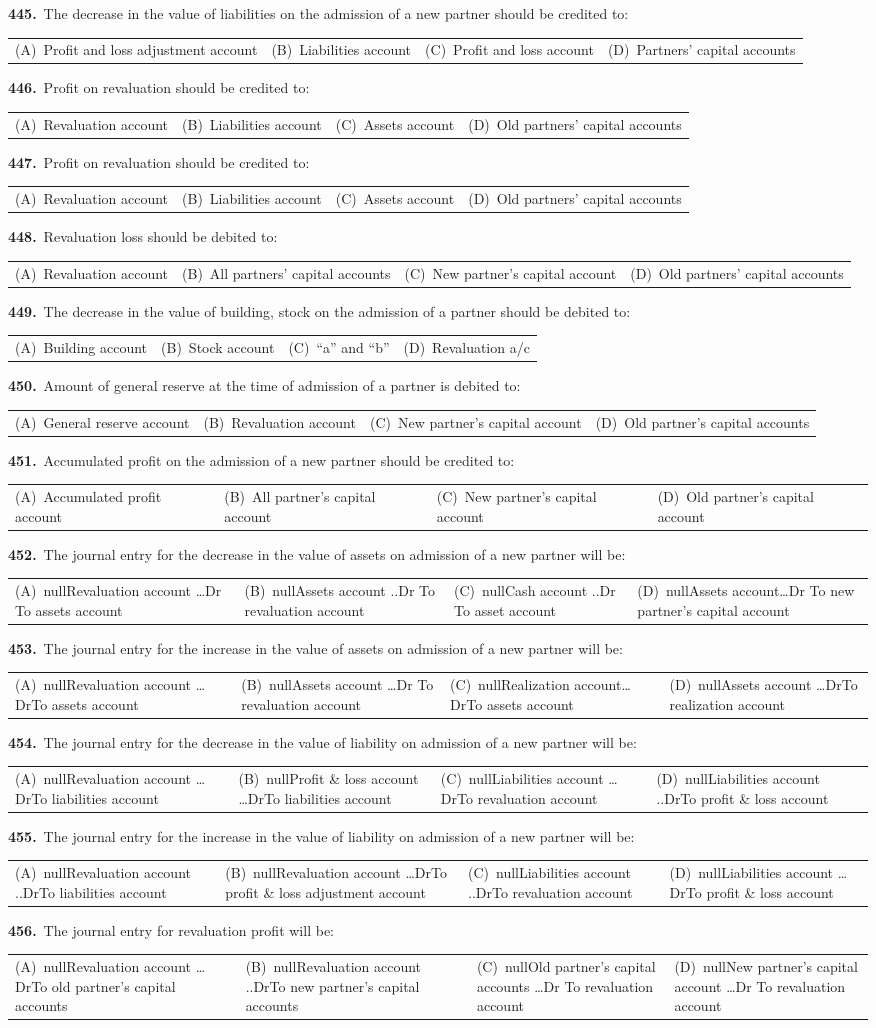 \documentclass[11pt,a4paper]{article}
\makeatletter
\newcommand{\mcq}[6]{%
  \Needspace{4\baselineskip}%
  \par\medskip\noindent\textbf{#1.}\ #2\par\nopagebreak
  \noindent\begin{tabularx}{\linewidth}{@{\hspace{1.5em}}*{4}{>{\raggedright\arraybackslash}X}@{}}
    (A)~#3 & (B)~#4 & (C)~#5 & (D)~#6
  \end{tabularx}\par}
\makeatother
\begin{document}
\mcq{445}{The decrease in the value of liabilities on the admission of a new partner should be credited to:}{Profit and loss adjustment account}{Liabilities account}{Profit and loss account}{Partners’ capital accounts}
\mcq{446}{Profit on revaluation should be credited to:}{Revaluation account}{Liabilities account}{Assets account}{Old partners’ capital accounts}
\mcq{447}{Profit on revaluation should be credited to:}{Revaluation account}{Liabilities account}{Assets account}{Old partners’ capital accounts}
\mcq{448}{Revaluation loss should be debited to:}{Revaluation account}{All partners’ capital accounts}{New partner’s capital account}{Old partners’ capital accounts}
\mcq{449}{The decrease in the value of building, stock on the admission of a partner should be debited to:}{Building account}{Stock account}{“a” and “b”}{Revaluation a/c}
\mcq{450}{Amount of general reserve at the time of admission of a partner is debited to:}{General reserve account}{Revaluation account}{New partner’s capital account}{Old partner’s capital accounts}
\mcq{451}{Accumulated profit on the admission of a new partner should be credited to:}{Accumulated profit account}{All partner’s capital account}{New partner’s capital account}{Old partner’s capital account}
\mcq{452}{The journal entry for the decrease in the value of assets on admission of a new partner will be:}{nullRevaluation account …Dr To assets account}{nullAssets account ..Dr To revaluation account}{nullCash account ..Dr To asset account}{nullAssets account…Dr To new partner’s capital account}
\mcq{453}{The journal entry for the increase in the value of assets on admission of a new partner will be:}{nullRevaluation account …DrTo assets account}{nullAssets account …Dr To revaluation account}{nullRealization account…DrTo assets account}{nullAssets account …DrTo realization account}
\mcq{454}{The journal entry for the decrease in the value of liability on admission of a new partner will be:}{nullRevaluation account …DrTo liabilities account}{nullProfit \& loss account …DrTo liabilities account}{nullLiabilities account …DrTo revaluation account}{nullLiabilities account ..DrTo profit \& loss account}
\mcq{455}{The journal entry for the increase in the value of liability on admission of a new partner will be:}{nullRevaluation account ..DrTo liabilities account}{nullRevaluation account …DrTo profit \& loss adjustment account}{nullLiabilities account ..DrTo revaluation account}{nullLiabilities account …DrTo profit \& loss account}
\mcq{456}{The journal entry for revaluation profit will be:}{nullRevaluation account …DrTo old partner’s capital accounts}{nullRevaluation account ..DrTo new partner’s capital accounts}{nullOld partner’s capital accounts …Dr To revaluation account}{nullNew partner’s capital account …Dr To revaluation account}
\end{document}
